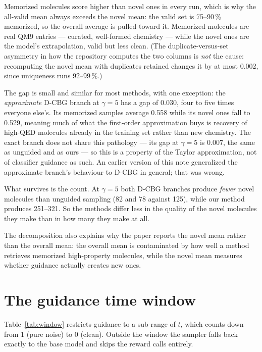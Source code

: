 \documentclass[11pt]{article}
\begin{document}
Memorized molecules score higher than novel ones in every run, which is why the
all-valid mean always exceeds the novel mean: the valid set is 75--90\,\%
memorized, so the overall average is pulled toward it. Memorized molecules are
real QM9 entries --- curated, well-formed chemistry --- while the novel ones are
the model's extrapolation, valid but less clean. (The duplicate-versus-set
asymmetry in how the repository computes the two columns is \emph{not} the
cause: recomputing the novel mean with duplicates retained changes it by at most
0.002, since uniqueness runs 92--99\,\%.)

The gap is small and similar for most methods, with one exception: the
\emph{approximate} D-CBG branch at $\gamma = 5$ has a gap of 0.030, four to five
times everyone else's. Its memorized samples average 0.558 while its novel ones
fall to 0.529, meaning much of what the first-order approximation buys is
recovery of high-QED molecules already in the training set rather than new
chemistry. The exact branch does not share this pathology --- its gap at
$\gamma = 5$ is 0.007, the same as unguided and as ours --- so this is a
property of the Taylor approximation, not of classifier guidance as such. An
earlier version of this note generalized the approximate branch's behaviour to
D-CBG in general; that was wrong.

What survives is the count. At $\gamma = 5$ both D-CBG branches produce
\emph{fewer} novel molecules than unguided sampling (82 and 78 against 125),
while our method produces 251--321. So the methods differ less in the quality of
the novel molecules they make than in how many they make at all.

The decomposition also explains why the paper reports the novel mean rather than
the overall mean: the overall mean is contaminated by how well a method
retrieves memorized high-property molecules, while the novel mean measures
whether guidance actually creates new ones.

\section{The guidance time window}
\label{sec:window}

Table~\ref{tab:window} restricts guidance to a sub-range of $t$, which counts
down from 1 (pure noise) to 0 (clean). Outside the window the sampler falls back
exactly to the base model and skips the reward calls entirely.
\end{document}
